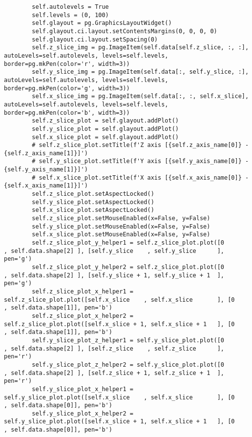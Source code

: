 \documentclass[../main.tex]{subfiles}
\begin{document}
\begin{lstlisting}
        self.autolevels = True
        self.levels = (0, 100)
        self.glayout = pg.GraphicsLayoutWidget()
        self.glayout.ci.layout.setContentsMargins(0, 0, 0, 0)
        self.glayout.ci.layout.setSpacing(0)
        self.z_slice_img = pg.ImageItem(self.data[self.z_slice, :, :], autoLevels=self.autolevels, levels=self.levels, border=pg.mkPen(color='r', width=3))
        self.y_slice_img = pg.ImageItem(self.data[:, self.y_slice, :], autoLevels=self.autolevels, levels=self.levels, border=pg.mkPen(color='g', width=3))
        self.x_slice_img = pg.ImageItem(self.data[:, :, self.x_slice], autoLevels=self.autolevels, levels=self.levels, border=pg.mkPen(color='b', width=3))
        self.z_slice_plot = self.glayout.addPlot()
        self.y_slice_plot = self.glayout.addPlot()
        self.x_slice_plot = self.glayout.addPlot()
        # self.z_slice_plot.setTitle(f'Z axis [{self.z_axis_name[0]} - {self.z_axis_name[1]}]')
        # self.y_slice_plot.setTitle(f'Y axis [{self.y_axis_name[0]} - {self.y_axis_name[1]}]')
        # self.x_slice_plot.setTitle(f'X axis [{self.x_axis_name[0]} - {self.x_axis_name[1]}]')
        self.z_slice_plot.setAspectLocked() 
        self.y_slice_plot.setAspectLocked() 
        self.x_slice_plot.setAspectLocked() 
        self.z_slice_plot.setMouseEnabled(x=False, y=False)
        self.y_slice_plot.setMouseEnabled(x=False, y=False)
        self.x_slice_plot.setMouseEnabled(x=False, y=False)
        self.z_slice_plot_y_helper1 = self.z_slice_plot.plot([0               , self.data.shape[2] ], [self.y_slice    , self.y_slice      ], pen='g')
        self.z_slice_plot_y_helper2 = self.z_slice_plot.plot([0               , self.data.shape[2] ], [self.y_slice + 1, self.y_slice + 1  ], pen='g')
        self.z_slice_plot_x_helper1 = self.z_slice_plot.plot([self.x_slice    , self.x_slice       ], [0               , self.data.shape[1]], pen='b')
        self.z_slice_plot_x_helper2 = self.z_slice_plot.plot([self.x_slice + 1, self.x_slice + 1   ], [0               , self.data.shape[1]], pen='b')
        self.y_slice_plot_z_helper1 = self.y_slice_plot.plot([0               , self.data.shape[2] ], [self.z_slice    , self.z_slice      ], pen='r')
        self.y_slice_plot_z_helper2 = self.y_slice_plot.plot([0               , self.data.shape[2] ], [self.z_slice + 1, self.z_slice + 1  ], pen='r')
        self.y_slice_plot_x_helper1 = self.y_slice_plot.plot([self.x_slice    , self.x_slice       ], [0               , self.data.shape[0]], pen='b')
        self.y_slice_plot_x_helper2 = self.y_slice_plot.plot([self.x_slice + 1, self.x_slice + 1   ], [0               , self.data.shape[0]], pen='b')

\end{lstlisting}
\end{document}
